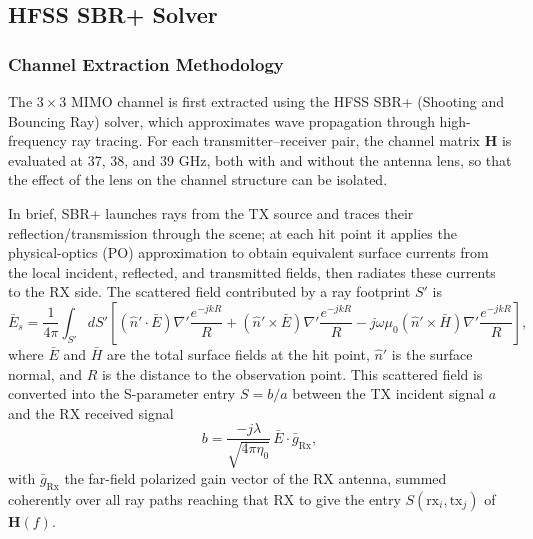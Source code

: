 \subsection{HFSS SBR+ Solver}
\subsubsection{Channel Extraction Methodology}

The $3\times3$ MIMO channel is first extracted using the HFSS SBR+ (Shooting and Bouncing Ray) solver, which approximates wave propagation through high-frequency ray tracing. For each transmitter--receiver pair, the channel matrix $\mathbf{H}$ is evaluated at 37, 38, and 39 GHz, both with and without the antenna lens, so that the effect of the lens on the channel structure can be isolated.

In brief, SBR+ launches rays from the TX source and traces their reflection/transmission through the scene; at each hit point it applies the physical-optics (PO) approximation to obtain equivalent surface currents from the local incident, reflected, and transmitted fields, then radiates these currents to the RX side. The scattered field contributed by a ray footprint $S'$ is
\begin{equation}
    \bar{E}_s = \frac{1}{4\pi}\int_{S'} dS' \left[ (\hat{n}'\cdot\bar{E})\nabla'\frac{e^{-jkR}}{R} + (\hat{n}'\times\bar{E})\nabla'\frac{e^{-jkR}}{R} - j\omega\mu_0(\hat{n}'\times\bar{H})\nabla'\frac{e^{-jkR}}{R} \right],
    \label{eq:sbr_scattered_field}
\end{equation}
where $\bar{E}$ and $\bar{H}$ are the total surface fields at the hit point, $\hat{n}'$ is the surface normal, and $R$ is the distance to the observation point. This scattered field is converted into the S-parameter entry $S=b/a$ between the TX incident signal $a$ and the RX received signal
\begin{equation}
    b = \frac{-j\lambda}{\sqrt{4\pi\eta_0}}\,\bar{E}\cdot\bar{g}_{\text{Rx}},
    \label{eq:sbr_received_signal}
\end{equation}
with $\bar{g}_{\text{Rx}}$ the far-field polarized gain vector of the RX antenna, summed coherently over all ray paths reaching that RX to give the entry $S(\mathrm{rx}_i,\mathrm{tx}_j)$ of $\mathbf{H}(f)$.

